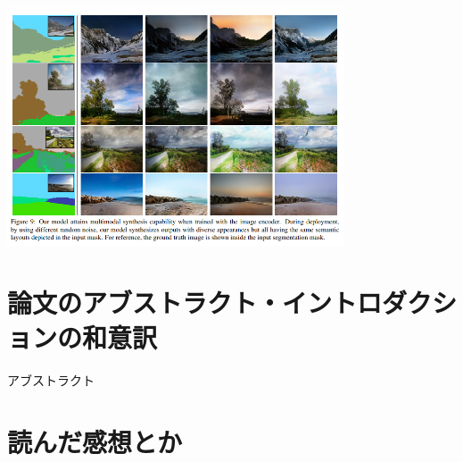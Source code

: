 \documentclass[a4paper, dvipdfmx, 10pt]{article}
\begin{document}
\begin{center}
\includegraphics[width=10cm]{./result2.png}
\end{center}
\section{論文のアブストラクト・イントロダクションの和意訳}
\label{sec:org9f99d73}
アブストラクト\\
\section{読んだ感想とか}
\label{sec:org0ae68da}
\end{document}
